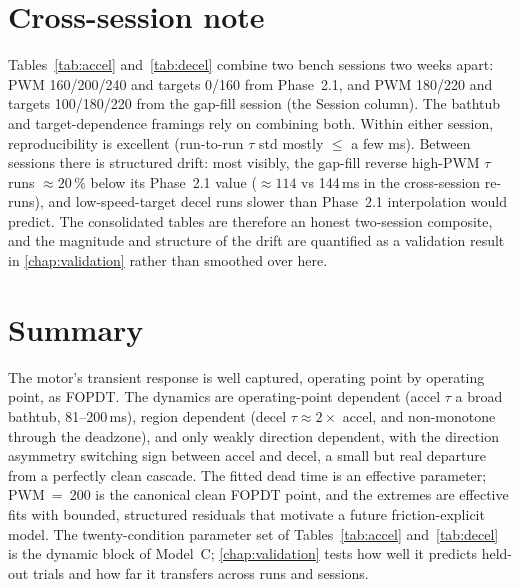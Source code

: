 \section{Cross-session note}
\label{sec:xsession}

Tables~\ref{tab:accel} and~\ref{tab:decel} combine two bench sessions two weeks apart: PWM 160/200/240 and targets 0/160 from Phase~2.1, and PWM 180/220 and targets 100/180/220 from the gap-fill session (the \textsf{Session} column). The bathtub and target-dependence framings rely on combining both. Within either session, reproducibility is excellent (run-to-run $\tau$ std mostly $\le$ a few ms). Between sessions there is structured drift: most visibly, the gap-fill reverse high-PWM $\tau$ runs ${\approx}20\,\%$ below its Phase~2.1 value (${\approx}114$ vs 144\,ms in the cross-session re-runs), and low-speed-target decel runs slower than Phase~2.1 interpolation would predict. The consolidated tables are therefore an honest two-session composite, and the magnitude and structure of the drift are quantified as a validation result in \cref{chap:validation} rather than smoothed over here.

\section{Summary}
\label{sec:dyn-summary}

The motor's transient response is well captured, operating point by operating point, as FOPDT. The dynamics are operating-point dependent (accel $\tau$ a broad bathtub, 81--200\,ms), region dependent (decel $\tau \approx 2\times$ accel, and non-monotone through the deadzone), and only weakly direction dependent, with the direction asymmetry switching sign between accel and decel, a small but real departure from a perfectly clean cascade. The fitted dead time is an effective parameter; PWM~=~200 is the canonical clean FOPDT point, and the extremes are effective fits with bounded, structured residuals that motivate a future friction-explicit model. The twenty-condition parameter set of Tables~\ref{tab:accel} and~\ref{tab:decel} is the dynamic block of Model~C; \cref{chap:validation} tests how well it predicts held-out trials and how far it transfers across runs and sessions.
